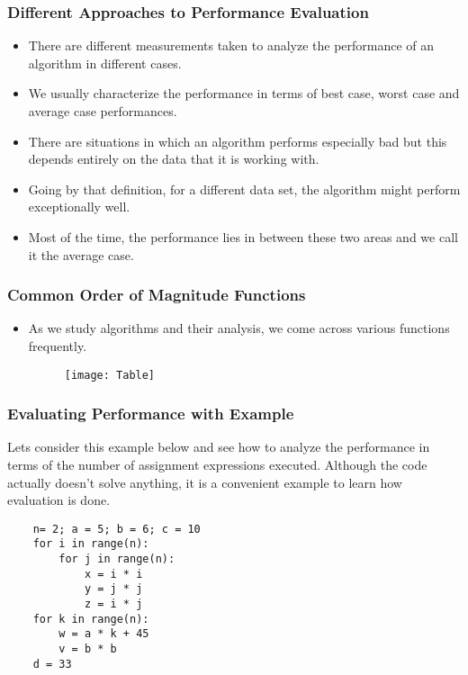 \documentclass{beamer}
\begin{document}
\begin{frame}
\frametitle{Different Approaches to Performance Evaluation}
\begin{itemize}
\item There are different measurements taken to analyze the performance of an algorithm in different cases.
\item We usually characterize the performance in terms of best case, worst case and average case performances.
\item There are situations in which an algorithm performs especially bad but this depends entirely on the data that it is working with.
\item Going by that definition, for a different data set, the algorithm might perform exceptionally well.
\item Most of the time, the performance lies in between these two areas and we call it the average case.
\end{itemize}
\end{frame}

\begin{frame}
\frametitle{Common Order of Magnitude Functions}
\begin{itemize}
\item As we study algorithms and their analysis, we come across various functions frequently.
\begin{figure}
\texttt{[image: Table]}
\end{figure}
\end{itemize}
\end{frame}


\begin{frame}[fragile]
\frametitle{Evaluating Performance with Example}
Lets consider this example below and see how to analyze the performance in terms of the number of assignment expressions executed.
Although the code actually doesn't solve anything, it is a convenient example to learn how evaluation is done.
\begin{lstlisting}
    n= 2; a = 5; b = 6; c = 10
    for i in range(n):
        for j in range(n):
            x = i * i
            y = j * j
            z = i * j
    for k in range(n):
        w = a * k + 45
        v = b * b
    d = 33
\end{lstlisting}
\end{frame}
\end{document}
